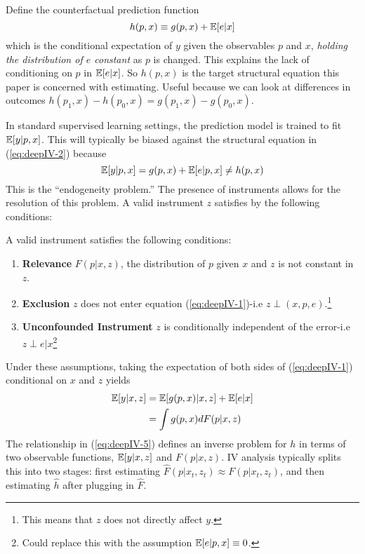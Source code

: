 Define the counterfactual prediction function 
\begin{equation}
	\label{eq:deepIV-2}
	h(p,x) \equiv g(p,x) + \mathbb{E}[e|x]
\end{equation}
which is the conditional expectation of $y$ given the observables $p$ and $x$, \emph{holding the distribution of $e$ constant} as $p$ is changed. This explains the lack of conditioning on $p$ in $\mathbb{E}[e|x]$. So $h(p,x)$ is the target structural equation this paper is concerned with estimating. Useful because we can look at differences in outcomes $h(p_1, x) - h(p_0, x) = g(p_1, x)- g(p_0,x)$.

In standard supervised learning settings, the prediction model is trained to fit $\mathbb{E}[y | p,x]$. This will typically be biased against the structural equation in (\ref{eq:deepIV-2}) because 
\begin{equation}
	\label{eq:deepIV-3}
	\mathbb{E}[y|p,x] = g(p,x) + \mathbb{E}[e|p,x] \neq h(p,x)
\end{equation}
This is the ``endogeneity problem.'' The presence of instruments allows for the resolution of this problem. A valid instrument $z$ satisfies by the following conditions:
\begin{assumption}
	A valid instrument satisfies the following conditions:
	\begin{enumerate}
		\item \textbf{Relevance} \(F(p|x,z)\), the distribution of $p$ given $x$ and $z$ is not constant in $z$. 
		\item \textbf{Exclusion} $z$ does not enter equation (\ref{eq:deepIV-1})-i.e $z \perp (x,p,e)$.\footnote{This means that $z$ does not directly affect $y.$}
		\item \textbf{Unconfounded Instrument} $z$ is conditionally independent of the error-i.e $z\perp e | x$\footnote{Could replace this with the assumption $\mathbb{E}[e|p,x] \equiv 0$.}
	\end{enumerate}
\end{assumption}
Under these assumptions, taking the expectation of both sides of (\ref{eq:deepIV-1}) conditional on $x$ and $z$ yields 
\begin{equation}
	\label{eq:deepIV-5}
	\begin{split}
		\mathbb{E}[y|x,z] &= \mathbb{E}[g(p,x)|x,z] + \mathbb{E}[e|x] \\
		&= \int g(p,x) dF(p|x,z)
	\end{split}
\end{equation}
The relationship in (\ref{eq:deepIV-5}) defines an inverse problem for $h$ in terms of two observable functions, $\mathbb{E}[y|x,z]$ and $F(p|x,z)$. IV analysis typically splits this into two stages: first estimating $\hat{F}(p|x_t, z_t) \approx F(p|x_t, z_t)$, and then estimating $\hat{h}$ after plugging in $\hat{F}$.

